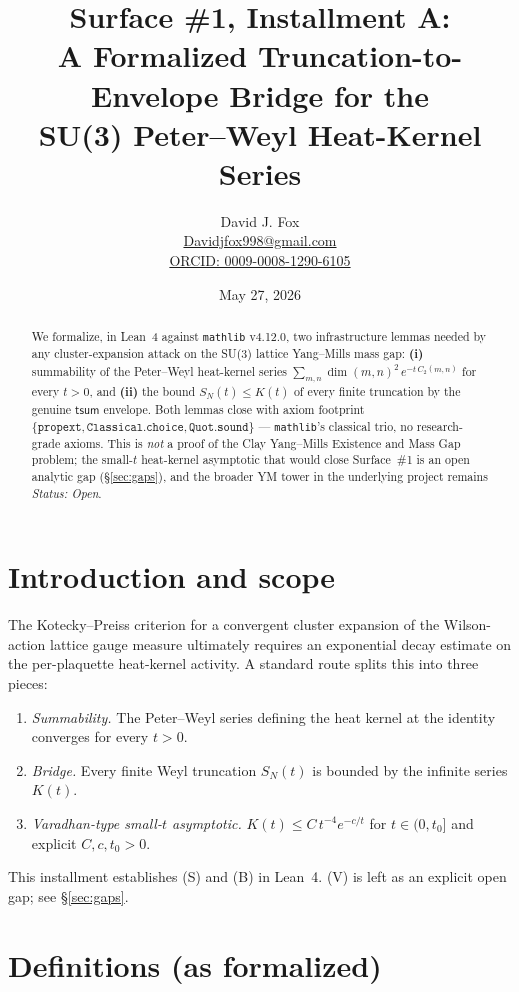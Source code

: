 \documentclass{article}
\title{Surface \#1, Installment A:\\
A Formalized Truncation-to-Envelope Bridge for the\\
SU(3) Peter--Weyl Heat-Kernel Series}
\author{David J. Fox \\
\href{mailto:Davidjfox998@gmail.com}{Davidjfox998@gmail.com} \\
\href{https://orcid.org/0009-0008-1290-6105}{ORCID: 0009-0008-1290-6105}}
\date{May 27, 2026}
\begin{document}
\maketitle

\begin{abstract}
We formalize, in Lean~4 against \texttt{mathlib} v4.12.0, two
infrastructure lemmas needed by any cluster-expansion attack on the
SU(3) lattice Yang--Mills mass gap:
\textbf{(i)} summability of the Peter--Weyl heat-kernel series
$\sum_{m,n} \dim(m,n)^2\, e^{-t\,C_2(m,n)}$ for every $t>0$, and
\textbf{(ii)} the bound $S_N(t) \le K(t)$ of every finite truncation
by the genuine $\mathsf{tsum}$ envelope. Both lemmas close with
axiom footprint $\{\texttt{propext}, \texttt{Classical.choice},
\texttt{Quot.sound}\}$ --- \texttt{mathlib}'s classical trio, no
research-grade axioms. This is \emph{not} a proof of the
Clay Yang--Mills Existence and Mass Gap problem; the small-$t$
heat-kernel asymptotic that would close Surface~\#1 is an open
analytic gap (\S\ref{sec:gaps}), and the broader YM tower in the
underlying project remains \emph{Status: Open}.
\end{abstract}

\section{Introduction and scope}

The Kotecky--Preiss criterion for a convergent cluster expansion of
the Wilson-action lattice gauge measure ultimately requires an
exponential decay estimate on the per-plaquette heat-kernel activity.
A standard route splits this into three pieces:
\begin{enumerate}
  \item[(S)] \emph{Summability.} The Peter--Weyl series defining the
        heat kernel at the identity converges for every $t>0$.
  \item[(B)] \emph{Bridge.} Every finite Weyl truncation $S_N(t)$ is
        bounded by the infinite series $K(t)$.
  \item[(V)] \emph{Varadhan-type small-$t$ asymptotic.}
        $K(t) \le C\,t^{-4} e^{-c/t}$ for $t \in (0,t_0]$ and
        explicit $C, c, t_0 > 0$.
\end{enumerate}
This installment establishes (S) and (B) in Lean~4. (V) is left as
an explicit open gap; see \S\ref{sec:gaps}.

\section{Definitions (as formalized)}
\end{document}
